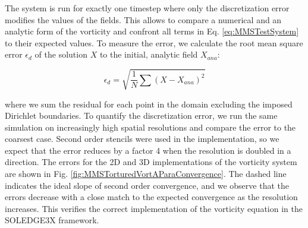 The system is run for exactly one timestep where only the discretization error modifies the values of the fields. This allows to compare a numerical and an analytic form of the vorticity and confront all terms in Eq. \ref{eq:MMSTestSystem} to their expected values. To measure the error, we calculate the root mean square error $\epsilon_d$ of the solution $X$ to the initial, analytic field $X_{ana}$:

\begin{equation}
	\epsilon_d = \sqrt{\frac{1}{N}\sum\left(X-X_{ana}\right)^2}
\end{equation}

where we sum the residual for each point in the domain excluding the imposed Dirichlet boundaries. To quantify the discretization error, we run the same simulation on increasingly high spatial resolutions and compare the error to the coarsest case. Second order stencils were used in the implementation, so we expect that the error reduces by a factor 4 when the resolution is doubled in a direction. The errors for the 2D and 3D implementations of the vorticity system are shown in Fig. \ref{fig:MMSTorturedVortAParaConvergence}. The dashed line indicates the ideal slope of second order convergence, and we observe that the errors decrease with a close match to the expected convergence as the resolution increases. This verifies the correct implementation of the vorticity equation in the SOLEDGE3X framework. 

